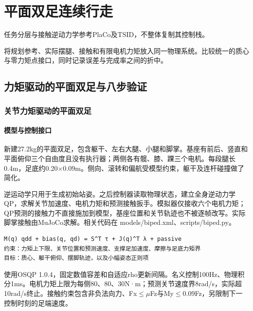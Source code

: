 \chapter{平面双足连续行走}
任务分层与接触逆动力学参考PlaCo\cite{placo}及TSID\cite{tsid}，不整体复制其控制栈。


将规划参考、实际摆腿、接触和有限电机力矩放入同一物理系统。比较统一的质心与零力矩点接口，同时记录误差与完成率之间的折中。

\section{力矩驱动的平面双足与八步验证}

\label{stage:s21}

\subsection{关节力矩驱动的平面双足}\label{s21-detail-1}

\subsubsection{模型与控制接口}\label{s21-detail-2}

新建27.2kg的平面双足，包含躯干、左右大腿、小腿和脚掌。基座有前后、竖直和平面俯仰三个自由度且没有执行器；两侧各有髋、膝、踝三个电机。每段腿长0.4m，足底约0.20\(\times\)0.09m。侧向、滚转和偏航受模型约束，躯干及连杆碰撞做了简化。

逆运动学只用于生成初始站姿。之后控制器读取物理状态，建立全身逆动力学QP，求解关节加速度、电机力矩和预测接触扳手。模拟器仅接收六个电机力矩；QP预测的接触力不直接施加到模型，基座位置和关节轨迹也不被逐帧改写。实际脚掌接触由MuJoCo求解。相关代码在 models/biped.xml、scripts/biped.py。

\begin{Verbatim}[breaklines=true,breakanywhere=true,fontsize=\footnotesize]
M(q) qdd + bias(q, qd) = S^T τ + J(q)^T λ + passive
约束：力矩上下限、关节位置和预测速度、支撑足加速度、摩擦与足底力矩界
目标：质心、躯干俯仰、摆脚轨迹，以及小幅姿态正则项
\end{Verbatim}

使用OSQP 1.0.4，固定数值容差和自适应rho更新间隔。名义控制100Hz、物理积分1ms。电机力矩上限为每侧80、80、30N·m；预测关节速度界8rad/s，实际超10rad/s终止。接触约束包含非负法向力、\textbar Fx\textbar{}\(\leq\)\(\mu\)Fz与\textbar My\textbar{}\(\leq\)0.09Fz，另限制下一控制时刻的足端速度。


